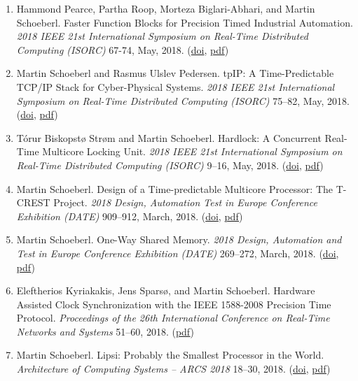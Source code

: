 \begin{enumerate}
\item Hammond Pearce, Partha Roop, Morteza Biglari-Abhari, and Martin Schoeberl.
 Faster Function Blocks for Precision Timed Industrial Automation.
 \emph{2018 IEEE 21st International Symposium on Real-Time Distributed Computing (ISORC)} 67-74, May, 2018.
(\href{http://dx.doi.org/10.1109/ISORC.2018.00017}{doi}, \href{https://www.jopdesign.com/doc/funblock_isorc2018.pdf}{pdf})

\item Martin Schoeberl and Rasmus Ulslev Pedersen.
 tpIP: A Time-Predictable TCP/IP Stack for Cyber-Physical Systems.
 \emph{2018 IEEE 21st International Symposium on Real-Time Distributed Computing (ISORC)} 75--82, May, 2018.
(\href{http://dx.doi.org/10.1109/ISORC.2018.00018}{doi}, \href{http://www.jopdesign.com/doc/iotprot.pdf}{pdf})

\item T{\'o}rur Biskopst{\o} Str{\o}m and Martin Schoeberl.
 Hardlock: A Concurrent Real-Time Multicore Locking Unit.
 \emph{2018 IEEE 21st International Symposium on Real-Time Distributed Computing (ISORC)} 9--16, May, 2018.
(\href{http://dx.doi.org/10.1109/ISORC.2018.00010}{doi}, \href{https://www.jopdesign.com/doc/hardlock.pdf}{pdf})

\item Martin Schoeberl.
 Design of a Time-predictable Multicore Processor: The T-CREST Project.
 \emph{2018 Design, Automation Test in Europe Conference Exhibition (DATE)} 909--912, March, 2018.
(\href{http://dx.doi.org/10.23919/DATE.2018.8342138}{doi}, \href{https://www.jopdesign.com/doc/t-crest-cont.pdf}{pdf})

\item Martin Schoeberl.
 One-Way Shared Memory.
 \emph{2018 Design, Automation and Test in Europe Conference Exhibition (DATE)} 269--272, March, 2018.
(\href{http://dx.doi.org/10.23919/DATE.2018.8342017}{doi}, \href{https://www.jopdesign.com/doc/onewaymem.pdf}{pdf})

\item Eleftherios Kyriakakis, Jens Spars{\o}, and Martin Schoeberl.
 Hardware Assisted Clock Synchronization with the IEEE 1588-2008 Precision Time Protocol.
 \emph{Proceedings of the 26th International Conference on Real-Time Networks and Systems} 51--60, 2018.
(\href{http://www.jopdesign.com/doc/ptpassist.pdf}{pdf})

\item Martin Schoeberl.
 Lipsi: Probably the Smallest Processor in the World.
 \emph{Architecture of Computing Systems -- ARCS 2018} 18--30, 2018.
(\href{http://dx.doi.org/10.1007/978-3-319-77610-1_2}{doi}, \href{https://www.jopdesign.com/doc/lipsi.pdf}{pdf})



\end{enumerate}
